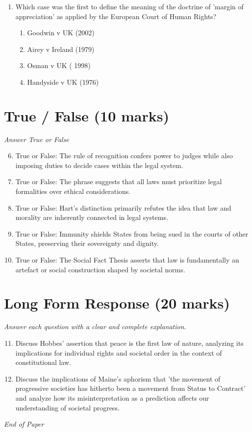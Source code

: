 \documentclass[12pt]{article}
\begin{document}
\begin{enumerate}[label=\arabic*.]
\begin{enumerate}[label=(\alph*)]
    \item Command, sovereign and legal remedy
    \item Command, sovereign and sanction
    \item Command, sovereign and obedience by subject
\end{enumerate}
\item Which case was the first to define the meaning of the doctrine of 'margin of appreciation' as applied by the European Court of Human Rights?
\begin{enumerate}[label=(\alph*)]
    \item Goodwin v UK (2002)
    \item Airey v Ireland (1979)
    \item Osman v UK ( 1998)
    \item Handyside v UK (1976)
\end{enumerate}
\end{enumerate}

\section*{True / False (10 marks)}
\textit{Answer True or False}
\begin{enumerate}[label=\arabic*.]
\setcounter{enumi}{5}
\item True or False: The rule of recognition confers power to judges while also imposing duties to decide cases within the legal system.
\item True or False: The phrase suggests that all laws must prioritize legal formalities over ethical considerations.
\item True or False: Hart's distinction primarily refutes the idea that law and morality are inherently connected in legal systems.
\item True or False: Immunity shields States from being sued in the courts of other States, preserving their sovereignty and dignity.
\item True or False: The Social Fact Thesis asserts that law is fundamentally an artefact or social construction shaped by societal norms.
\end{enumerate}

\section*{Long Form Response (20 marks)}
\textit{Answer each question with a clear and complete explanation.}
\begin{enumerate}[label=\arabic*.]
\setcounter{enumi}{10}
\item Discuss Hobbes' assertion that peace is the first law of nature, analyzing its implications for individual rights and societal order in the context of constitutional law.
\item Discuss the implications of Maine's aphorism that 'the movement of progressive societies has hitherto been a movement from Status to Contract' and analyze how its misinterpretation as a prediction affects our understanding of societal progress.
\end{enumerate}

\vfill
\noindent\textit{End of Paper}
\end{document}

